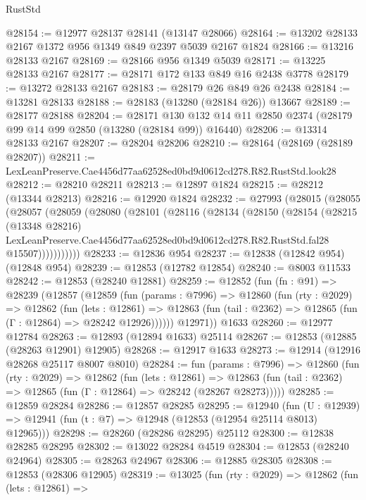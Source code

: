\begin{lexlean}{RustStd}
\begin{coremodule}
@28154 := @12977 @28137 @28141 (@13147 @28066)
@28164 := @13202 @28133 @2167 @1372 @956 @1349 @849 @2397 @5039 @2167 @1824
@28166 := @13216 @28133 @2167
@28169 := @28166 @956 @1349 @5039
@28171 := @13225 @28133 @2167
@28177 := @28171 @172 @133 @849 @16 @2438 @3778
@28179 := @13272 @28133 @2167
@28183 := @28179 @26 @849 @26 @2438
@28184 := @13281 @28133
@28188 := @28183 (@13280 (@28184 @26)) @13667
@28189 := @28177 @28188
@28204 := @28171
    @130
    @132
    @14
    @11
    @2850
    @2374
    (@28179 @99 @14 @99 @2850 (@13280 (@28184 @99)) @16440)
@28206 := @13314 @28133 @2167
@28207 := @28204 @28206
@28210 := @28164 (@28169 (@28189 @28207))
@28211 := LexLeanPreserve.Cae4456d77aa62528ed0bd9d0612cd278.R82.RustStd.look28
@28212 := @28210 @28211
@28213 := @12897 @1824
@28215 := @28212 (@13344 @28213)
@28216 := @12920 @1824
@28232 := @27993
    (@28015
      (@28055
        (@28057
          (@28059
            (@28080
              (@28101
                (@28116
                  (@28134
                    (@28150
                      (@28154
                        (@28215
                          (@13348 @28216)
                          LexLeanPreserve.Cae4456d77aa62528ed0bd9d0612cd278.R82.RustStd.fal28
                          @15507)))))))))))
@28233 := @12836 @954
@28237 := @12838 (@12842 @954) (@12848 @954)
@28239 := @12853 (@12782 @12854)
@28240 := @8003 @11533
@28242 := @12853 (@28240 @12881)
@28259 := @12852
    (fun (fn : @91) =>
    @28239
      (@12857
        (@12859
          (fun (params : @7996) =>
          @12860
            (fun (rty : @2029) =>
            @12862
              (fun (lets : @12861) =>
              @12863 (fun (tail : @2362) => @12865 (fun (Γ : @12864) => @28242 @12926))))))
        @12971))
    @1633
@28260 := @12977 @12784
@28263 := @12893 (@12894 @1633) @25114
@28267 := @12853 (@12885 (@28263 @12901) @12905)
@28268 := @12917 @1633
@28273 := @12914 (@12916 @28268 @25117 @8007 @8010)
@28284 := fun (params : @7996) =>
  @12860
    (fun (rty : @2029) =>
    @12862
      (fun (lets : @12861) =>
      @12863 (fun (tail : @2362) => @12865 (fun (Γ : @12864) => @28242 (@28267 @28273)))))
@28285 := @12859 @28284
@28286 := @12857 @28285
@28295 := @12940
    (fun (U : @12939) => @12941 (fun (t : @7) => @12948 (@12853 (@12954 @25114 @8013) @12965)))
@28298 := @28260 (@28286 @28295) @25112
@28300 := @12838 @28285 @28295
@28302 := @13022 @28284 @4519
@28304 := @12853 (@28240 @24964)
@28305 := @28263 @24967
@28306 := @12885 @28305
@28308 := @12853 (@28306 @12905)
@28319 := @13025
    (fun (rty : @2029) =>
    @12862
      (fun (lets : @12861) =>

\end{coremodule}
\end{lexlean}
